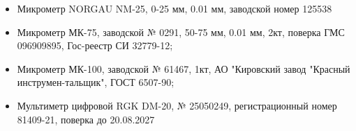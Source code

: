 \begin{itemize}
	\item 
	Микрометр NORGAU NM-25, 0-25 мм, 0.01 мм, заводской номер 125538
	\item 	
	Микрометр МК-75, заводской № 0291, 50-75 мм, 0.01 мм, 2кт, поверка ГМС 096909895, Гос-реестр СИ 32779-12;
	\item 
	Микрометр МК-100, заводской № 61467,  1кт, АО "Кировский завод "Красный инструмен-тальщик", ГОСТ 6507-90;
	\item Мультиметр цифровой RGK DM-20, № 25050249, регистрационный номер 81409-21, поверка до 	20.08.2027

\end{itemize}
